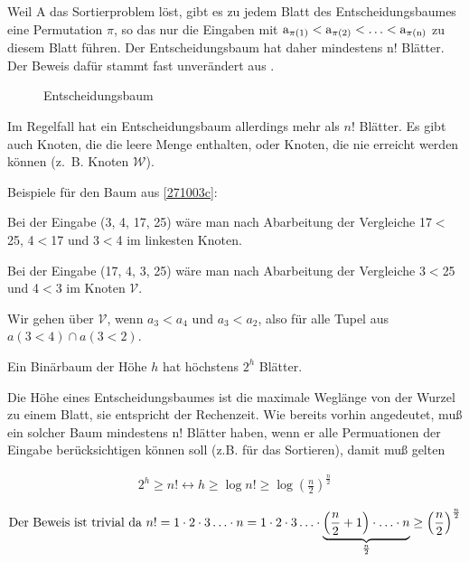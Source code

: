 \begin{beweis}
Weil A das Sortierproblem löst, gibt es zu jedem Blatt des Entscheidungsbaumes eine Permutation $\pi$, so das nur die Eingaben mit 
\(\textup{a}_{\pi(1)}<\textup{a}_{\pi(2)}<\ldots<\textup{a}_{\pi(\textup{n})}\) zu diesem Blatt führen. Der Entscheidungsbaum hat 
daher mindestens n! Blätter. Der Beweis dafür stammt fast unverändert aus \cite{klein}.
 
%
  \begin{figure}
    \centering
  \caption{Entscheidungsbaum}
  \label{271003c}
  \end{figure}

Im Regelfall hat ein Entscheidungsbaum allerdings mehr 
als $n!$ Blätter. Es gibt auch Knoten, die die leere Menge enthalten, oder Knoten, die nie erreicht werden können
(z.~B. Knoten $\mathcal{W}$).
\bigskip

\noindent	
Beispiele für den Baum aus \autoref{271003c}:

\noindent
Bei der Eingabe (3, 4, 17, 25) wäre man nach Abarbeitung der Vergleiche 17$<$25, 4$<$17 und 3$<$4 im linkesten Knoten.

\noindent
Bei der Eingabe (17, 4, 3, 25) wäre man nach Abarbeitung der Vergleiche 3$<$25 und 4$<$3 im Knoten $\mathcal{V}$.

\noindent
Wir gehen über $\mathcal{V}$, wenn $a_3 < a_4$ und $a_3 < a_2 $, also für alle Tupel aus \( a(3<4) \cap a(3<2) \).

  \begin{satz}
  Ein Binärbaum der Höhe $h$ hat höchstens \( 2^h \) Blätter.
  \end{satz} 
 
Die Höhe eines Entscheidungsbaumes ist die maximale Weglänge von der Wurzel zu einem Blatt, sie entspricht der Rechenzeit. Wie bereits vorhin angedeutet, muß ein
solcher Baum mindestens n! Blätter haben, wenn er alle Permuationen der Eingabe berücksichtigen können soll (z.B. für das
Sortieren), damit muß gelten

  \begin{gather*}
   2^h \geq n! \leftrightarrow h \geq \log n! \geq \log \left(\frac{n}{2}\right)^{\frac{n}{2}}  
  \end{gather*}

  \begin{gather*}
  \textup{Der Beweis ist trivial da}\
  n! = 1 \cdot 2 \cdot 3 \ldots \cdot n = 1 \cdot 2 \cdot 3 \ldots \cdot \underbrace{\left(\frac{n}{2}+1\right) \cdot \ldots 
  \cdot n}_{\frac{n}{2}} \geq \left(\frac{n}{2}\right)^{\frac{n}{2}} 
  \end{gather*}


\end{beweis}
